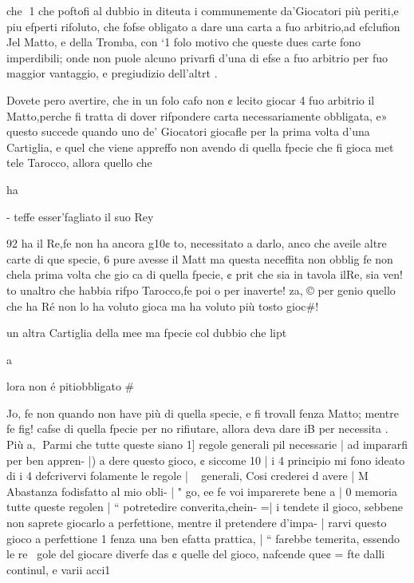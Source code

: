 \documentclass[12pt,a6paper]{article}
\begin{document}
che
1
che poftofi al dubbio in diteuta
i communemente da’Giocatori più periti,e piu efperti rifoluto, che fofse obligato a dare una
carta a fuo arbitrio,ad efclufion
Jel Matto, e della Tromba, con
‘1 folo motivo che queste dues
carte fono imperdibili; onde
non puole alcuno privarfi d’una
di efse a fuo arbitrio per fuo
maggior vantaggio, e pregiudizio dell’altrt .

Dovete pero avertire, che in
un folo cafo non ¢ lecito giocar
4 fuo arbitrio il Matto,perche fi
tratta di dover rifpondere carta
necessariamente obbligata, e»
questo succede quando uno de’
Giocatori giocafle per la prima
volta d’una Cartiglia, e quel
che viene appreffo non avendo
di quella fpecie che fi gioca met
tele Tarocco, allora quello che

ha
 

 

 

 

 

 

 

- teffe esser’fagliato il suo Rey

92
ha il Re,fe non ha ancora g10¢
to, necessitato a darlo, anco
che aveile altre carte di que
specie, 6 pure avesse il Matt
ma questa neceffita non obblig
fe non chela prima volta che
gio ca di quella fpecie, ¢ prit
che sia in tavola ilRe, sia ven!
to unaltro che habbia rifpo
Tarocco,fe poi o per inaverte!
za, © per genio quello che ha
Ré non lo ha voluto gioca
ma ha voluto più tosto gioc#!

un altra Cartiglia della mee
ma fpecie col dubbio che lipt

a

lora non é pitiobbligato #

Jo, fe non quando non have
più di quella specie, e fi trovall
fenza Matto; mentre fe fig!
cafse di quella fpecie per no
rifiutare, allora deva dare iB
per necessita . Più
a,
Parmi che tutte queste siano 1]
regole generali pil necessarie |
ad impararfi per ben appren- |)
a dere questo gioco, ¢ siccome 10 |
i 4 principio mi fono ideato di i
4 defcrivervi folamente le regole |
~ generali, Cosi crederei d avere |
M Abastanza fodisfatto al mio obli- |
" go, ee fe voi imparerete bene a |
0 memoria tutte queste regolen |
“ potretedire converita,chein- =|
i tendete il gioco, sebbene non
 saprete giocarlo a perfettione,
mentre il pretendere d’impa- |
rarvi questo gioco a perfettione 1
fenza una ben efatta prattica, |
“  farebbe temerita, essendo le re~ gole del giocare diverfe das
¢ quelle del gioco, nafcende que¢ = fte dalli continul, e varii acci1
\end{document}
